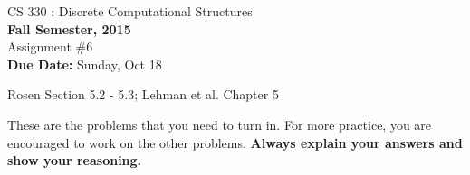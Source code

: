 \setlength{\oddsidemargin}{12pt}
\setlength{\textwidth}{6.5in}
\setlength{\textheight}{9in}
\pagestyle{empty}
\setlength{\parskip}{7pt plus 2pt minus 2pt}



\begin{center}
{{\large CS 330 : Discrete Computational Structures}}\\


{\bf Fall Semester, 2015}\\

{\sc Assignment \#6}\\
{\bf Due Date:}  Sunday, Oct 18
\end{center}

 Rosen Section 5.2 - 5.3; Lehman et al. Chapter 5

These are the problems that you need to turn in. For more
practice, you are encouraged to work on the other problems. {\bf Always
explain your answers and show your reasoning.}

